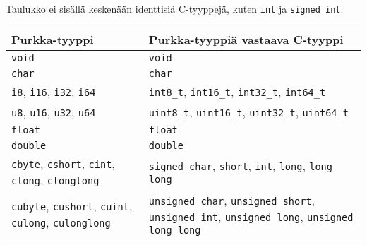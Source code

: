 

\renewcommand{\subsection}[1]{\vspace{1.7ex}{\large\textbf{#1}\vspace{1.3ex}}}


\subsection{Alkeistyypit}

Taulukko ei sisällä keskenään identtisiä C-tyyppejä, kuten \texttt{int} ja
\texttt{signed int}. \\[0.3cm]
\begin{tabular}{@{}p{5.8cm}p{8.7cm}@{}} \toprule
    Purkka-tyyppi & Purkka-tyyppiä vastaava C-tyyppi \\ \midrule
    \texttt{void} & \texttt{void} \\
    \texttt{char} & \texttt{char} \\
    \texttt{i8}, \texttt{i16}, \texttt{i32}, \texttt{i64} &
    \texttt{int8\_t}, \texttt{int16\_t}, \texttt{int32\_t}, \texttt{int64\_t} \\
    \texttt{u8}, \texttt{u16}, \texttt{u32}, \texttt{u64} &
    \texttt{uint8\_t}, \texttt{uint16\_t}, \texttt{uint32\_t}, \texttt{uint64\_t} \\
    \texttt{float} & \texttt{float} \\
    \texttt{double} & \texttt{double} \\
    [0.3cm]

    \texttt{cbyte}, \texttt{cshort}, \texttt{cint}, \texttt{clong}, \texttt{clonglong}
    & \texttt{signed char}, \texttt{short}, \texttt{int}, \texttt{long}, \texttt{long long} \\
    \noalign{\vspace{0.3cm}}

    \texttt{cubyte}, \texttt{cushort}, \texttt{cuint}, \texttt{culong}, \texttt{culonglong}
    & \texttt{unsigned char}, \texttt{unsigned short}, \texttt{unsigned int},
      \texttt{unsigned long}, \texttt{unsigned long long} \\
    \bottomrule
\end{tabular} \\


